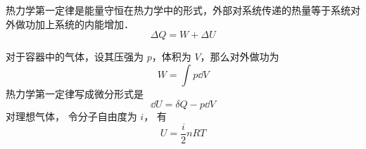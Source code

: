 
\begin{issues}
\issueDraft
\end{issues}


热力学第一定律是能量守恒在热力学中的形式，外部对系统传递的热量等于系统对外做功加上系统的内能增加．
\begin{equation}\label{Th1Law_eq1}
\Delta Q = W + \Delta U
\end{equation}

对于容器中的气体，设其压强为 $p$，体积为 $V$，那么对外做功为
\begin{equation}
W = \int p \dd{V}
\end{equation}
热力学第一定律写成微分形式是
\begin{equation}
\dd U=\delta Q-p\dd V
\end{equation}
对理想气体， 令分子自由度为 $i$， 有
\begin{equation}
U = \frac{i}{2}n RT
\end{equation}
